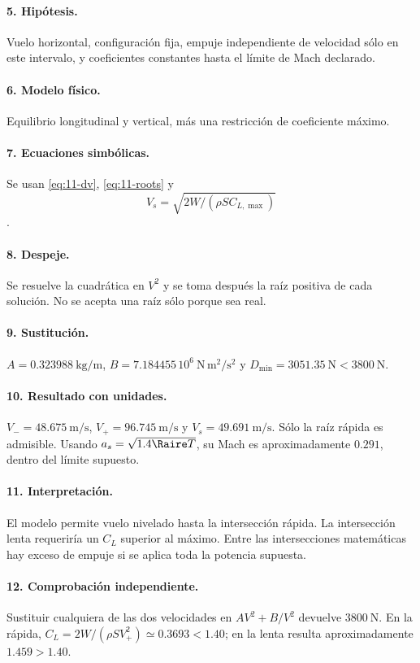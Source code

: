 \paragraph{5. Hipótesis.} Vuelo horizontal, configuración fija, empuje independiente de velocidad sólo en este intervalo, y coeficientes constantes hasta el límite de Mach declarado.
\paragraph{6. Modelo físico.} Equilibrio longitudinal y vertical, más una restricción de coeficiente máximo.
\paragraph{7. Ecuaciones simbólicas.} Se usan \eqref{eq:11-dv}, \eqref{eq:11-roots} y \[V_s=\sqrt{2W/(\rho SC_{L,\max})}\].
\paragraph{8. Despeje.} Se resuelve la cuadrática en $V^2$ y se toma después la raíz positiva de cada solución. No se acepta una raíz sólo porque sea real.
\paragraph{9. Sustitución.} $A=0.323988\ \mathrm{kg/m}$, $B=7.184455\,10^6\ \mathrm{N\,m^2/s^2}$ y $D_{\min}=3051.35\ \mathrm N<3800\ \mathrm N$.
\paragraph{10. Resultado con unidades.} $V_-=48.675\ \mathrm{m/s}$, $V_+=96.745\ \mathrm{m/s}$ y $V_s=49.691\ \mathrm{m/s}$. Sólo la raíz rápida es admisible. Usando $a_s=\sqrt{1.4\Raire T}$, su Mach es aproximadamente $0.291$, dentro del límite supuesto.
\paragraph{11. Interpretación.} El modelo permite vuelo nivelado hasta la intersección rápida. La intersección lenta requeriría un $C_L$ superior al máximo. Entre las intersecciones matemáticas hay exceso de empuje si se aplica toda la potencia supuesta.
\paragraph{12. Comprobación independiente.} Sustituir cualquiera de las dos velocidades en $AV^2+B/V^2$ devuelve $3800\ \mathrm N$. En la rápida, $C_L=2W/(\rho SV_+^2)\simeq0.3693<1.40$; en la lenta resulta aproximadamente $1.459>1.40$.
